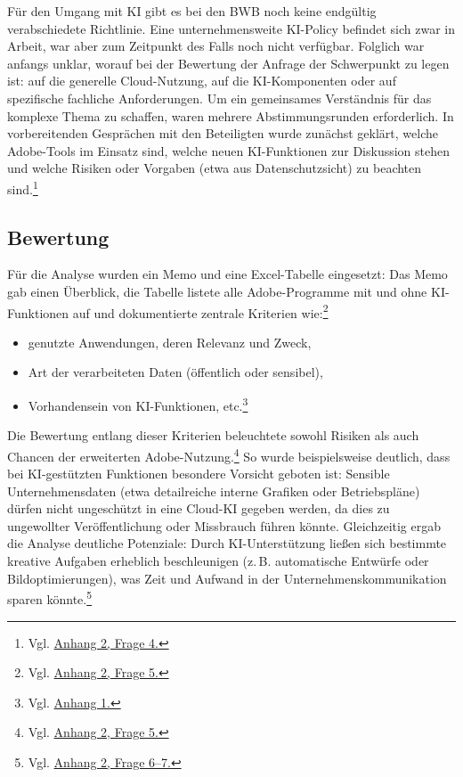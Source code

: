 \documentclass[
    12pt, 
    a4paper,
    ]{scrartcl} %
\begin{document}
Für den Umgang mit KI gibt es bei den BWB noch keine endgültig verabschiedete Richtlinie. Eine unternehmensweite KI-Policy befindet sich zwar in Arbeit, war aber zum Zeitpunkt des Falls noch nicht verfügbar. Folglich war anfangs unklar, worauf bei der Bewertung der Anfrage der Schwerpunkt zu legen ist: auf die generelle Cloud-Nutzung, auf die KI-Komponenten oder auf spezifische fachliche Anforderungen. Um ein gemeinsames Verständnis für das komplexe Thema zu schaffen, waren mehrere Abstimmungsrunden erforderlich. In vorbereitenden Gesprächen mit den Beteiligten wurde zunächst geklärt, welche Adobe-Tools im Einsatz sind, welche neuen KI-Funktionen zur Diskussion stehen und welche Risiken oder Vorgaben (etwa aus Datenschutzsicht) zu beachten sind.\footnote{Vgl. \hyperref[sec:Anhang2]{Anhang 2, Frage 4.}}

\subsection{Bewertung}

Für die Analyse wurden ein Memo und eine Excel-Tabelle eingesetzt: Das Memo gab einen Überblick, die Tabelle listete alle Adobe-Programme mit und ohne KI-Funktionen auf und dokumentierte zentrale Kriterien wie:\footnote{Vgl. \hyperref[sec:Anhang2]{Anhang 2, Frage 5.}}
\begin{itemize}
    \item genutzte Anwendungen, deren Relevanz und Zweck,
    \item Art der verarbeiteten Daten (öffentlich oder sensibel),
    \item Vorhandensein von KI-Funktionen, etc.\footnote{Vgl. \hyperref[sec:Anhang1]{Anhang 1.}}
\end{itemize}

Die Bewertung entlang dieser Kriterien beleuchtete sowohl Risiken als auch Chancen der erweiterten Adobe-Nutzung.\footnote{Vgl. \hyperref[sec:Anhang2]{Anhang 2, Frage 5.}} So wurde beispielsweise deutlich, dass bei KI-gestützten Funktionen besondere Vorsicht geboten ist: Sensible Unternehmensdaten (etwa detailreiche interne Grafiken oder Betriebspläne) dürfen nicht ungeschützt in eine Cloud-KI gegeben werden, da dies zu ungewollter Veröffentlichung oder Missbrauch führen könnte. Gleichzeitig ergab die Analyse deutliche Potenziale: Durch KI-Unterstützung ließen sich bestimmte kreative Aufgaben erheblich beschleunigen (z.\,B. automatische Entwürfe oder Bildoptimierungen), was Zeit und Aufwand in der Unternehmenskommunikation sparen könnte.\footnote{Vgl. \hyperref[sec:Anhang2]{Anhang 2, Frage 6--7.}}
\end{document}
